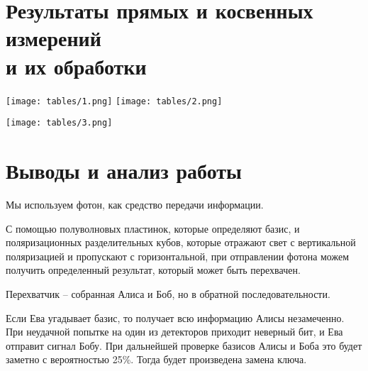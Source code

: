 \documentclass[12pt, a4paper]{article}
\begin{document}
\section{Результаты прямых и косвенных измерений\\ и их обработки}

\texttt{[image: tables/1.png]}
\texttt{[image: tables/2.png]}

\texttt{[image: tables/3.png]}

\section{Выводы и анализ работы}

 Мы используем фотон, как средство передачи информации.
 
 С помощью полуволновых пластинок, которые определяют базис, и поляризационных разделительных кубов, которые отражают свет с вертикальной поляризацией и пропускают с горизонтальной, при отправлении фотона можем получить определенный результат, который может быть перехвачен.

Перехватчик -- собранная Алиса и Боб, но в обратной последовательности.

Если Ева угадывает базис, то получает всю информацию Алисы незамеченно. 
При неудачной попытке на один из детекторов приходит неверный бит, и Ева отправит сигнал Бобу. При дальнейшей проверке базисов Алисы и Боба это будет заметно с вероятностью 25\%. Тогда будет произведена замена ключа.
\end{document}
